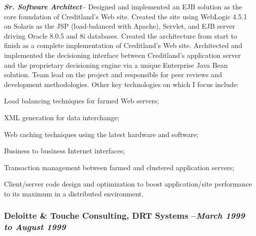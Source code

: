 \documentclass[10pt]{report}
\begin{document}
  \begin{description}

    \item{\bf{\emph{Sr. Software Architect--}}} Designed and implemented an EJB
    solution as the core foundation of Creditland's Web site.  Created the  site
    using WebLogic 4.5.1 on Solaris as the JSP (load-balanced with  Apache),
    Servlet, and EJB server driving Oracle 8.0.5 and 8i databases.   Created the
    architecture from start to finish as a complete implementation  of
    Creditland's Web site.  Architected and implemented the decisioning
    interface between Creditland's  application server and the proprietary
    decisioning engine via a unique  Enterprise Java Bean solution.  Team lead
    on the project and responsible  for peer reviews and development
    methodologies.  Other key technologies on which I focus include:

    	\begin{list}{-}{}

    		\item Load balancing techniques for farmed Web servers;

    		\item XML generation for data interchange;

    		\item Web caching techniques using the latest hardware and software;

    		\item Business to business Internet interfaces;

    		\item Transaction management between farmed and clustered application
    		servers;

    		\item Client/server code design and optimization to boost
    		application/site performance to its maximum in a distributed
    		environment.

    	\end{list}

 \end{description}

  \subsubsection*{Deloitte \& Touche Consulting, DRT Systems --\emph{March 1999
  to August 1999}}
\end{document}
